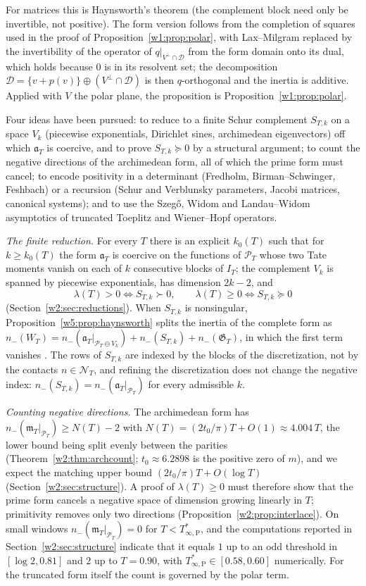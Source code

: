 \documentclass[11pt]{amsart}
\theoremstyle{definition}
\theoremstyle{remark}
\numberwithin{equation}{section}
\newcommand{\IT}{I_T}                                  %
\newcommand{\PT}{\mathcal{P}_T}                        %
\newcommand{\NT}{\mathcal{N}_T}                        %
\newcommand{\mT}{\mathfrak{m}_T}                       %
\newcommand{\aT}{\mathfrak{a}_T}                       %
\newcommand{\WT}{W_T}                                  %
\newcommand{\lam}{\lambda(T)}                          %
\newcommand{\Tarch}{T^{*}_{\infty,\mathrm P}}          %
\begin{document}
For matrices this is Haynsworth's theorem \cite{Haynsworth1968} (the complement block need only be invertible, not
positive). The form version follows from the completion of squares used in the proof of
Proposition~\ref{w1:prop:polar}, with Lax--Milgram replaced by the invertibility of the operator of
$q|_{V^\perp\cap\mathcal D}$ from the form domain onto its dual, which holds because $0$ is in its resolvent set; the
decomposition $\mathcal D=\{v+p(v)\}\oplus(V^\perp\cap\mathcal D)$ is then $q$-orthogonal and the inertia is additive.
Applied with $V$ the polar plane, the proposition is Proposition~\ref{w1:prop:polar}.

Four ideas have been pursued: to reduce to a finite Schur complement $S_{T,k}$ on a space $V_k$ (piecewise
exponentials, Dirichlet sines, archimedean eigenvectors) off which $\aT$ is coercive, and to prove $S_{T,k}\succeq0$ by
a structural argument; to count the negative directions of the archimedean form, all of which the prime form must
cancel; to encode positivity in a determinant (Fredholm, Birman--Schwinger, Feshbach) or a recursion (Schur and
Verblunsky parameters, Jacobi matrices, canonical systems); and to use the Szeg\H{o}, Widom and Landau--Widom
asymptotics of truncated Toeplitz and Wiener--Hopf operators.

\emph{The finite reduction.} For every $T$ there is an explicit $k_0(T)$ such that for $k\ge k_0(T)$ the form $\aT$ is
coercive on the functions of $\PT$ whose two Tate moments vanish on each of $k$ consecutive blocks of $\IT$; the
complement $V_k$ is spanned by piecewise exponentials, has dimension $2k-2$, and
\[
  \lam>0\iff S_{T,k}\succ0,\qquad \lam\ge0\iff S_{T,k}\succeq0
\]
\cite[Theorem~10.14]{P46} (Section~\ref{w2:sec:reductions}). When $S_{T,k}$ is nonsingular,
Proposition~\ref{w5:prop:haynsworth} splits the inertia of the complete form as
$n_-(\WT)=n_-(\aT|_{\PT\ominus V_k})+n_-(S_{T,k})+n_-(\mathfrak G_T)$, in which the first term vanishes
\cite[Remark~10.15]{P46}. The rows of $S_{T,k}$ are indexed by the blocks of the discretization, not by the contacts
$n\in\NT$, and refining the discretization does not change the negative index: $n_-(S_{T,k})=n_-(\aT|_{\PT})$ for every
admissible $k$.

\emph{Counting negative directions.} The archimedean form has $n_-(\mT|_{\PT})\ge N(T)-2$ with
$N(T)=(2t_0/\pi)T+O(1)\approx4.004\,T$, the lower bound being split evenly between the parities
(Theorem~\ref{w2:thm:archcount}; $t_0\approx6.2898$ is the positive zero of $m$), and we expect the matching upper bound
$(2t_0/\pi)T+O(\log T)$ (Section~\ref{w2:sec:structure}). A proof of $\lam\ge0$ must therefore show that the prime form
cancels a negative space of dimension growing linearly in $T$; primitivity removes only two directions
(Proposition~\ref{w2:prop:interlace}). On small windows $n_-(\mT|_{\PT})=0$ for $T<\Tarch$, and the computations
reported in Section~\ref{w2:sec:structure} indicate that it equals $1$ up to an odd threshold in $[\log2,0.81]$ and $2$
up to $T=0.90$, with $\Tarch\in[0.58,0.60]$ numerically. For the truncated form itself the count is governed by the
polar term.
\end{document}
